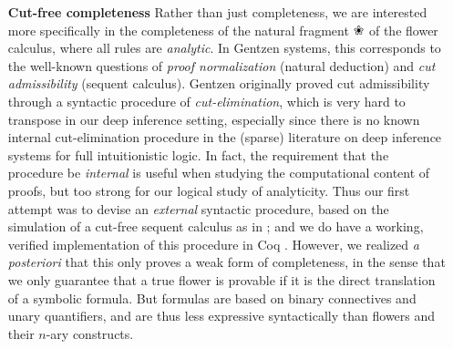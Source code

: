 \begin{itemize}
  \item[\textbf{Cut-free completeness}]
    Rather than just completeness, we are interested more specifically in the
    completeness of the natural fragment $\Nature$ of the flower calculus, where
    all rules are \emph{analytic}. In Gentzen systems, this corresponds to the
    well-known questions of \emph{proof normalization} (natural deduction) and
    \emph{cut admissibility} (sequent calculus). Gentzen originally proved cut
    admissibility through a syntactic procedure of \emph{cut-elimination}, which
    is very hard to transpose in our deep inference setting, especially since
    there is no known internal cut-elimination procedure in the (sparse)
    literature on deep inference systems for full intuitionistic logic. In fact,
    the requirement that the procedure be \emph{internal} is useful when
    studying the computational content of proofs, but too strong for our logical
    study of analyticity. Thus our first attempt was to devise an
    \emph{external} syntactic procedure, based on the simulation of a cut-free
    sequent calculus as in ; and we do have a working,
    verified implementation of this procedure in Coq \cite{flowers-metatheory}.
    However, we realized \textit{a posteriori} that this only proves a weak form
    of completeness, in the sense that we only guarantee that a true flower is
    provable if it is the direct translation of a symbolic formula. But formulas
    are based on binary connectives and unary quantifiers, and are thus less
    expressive syntactically than flowers and their $n$-ary constructs.


\end{itemize}

